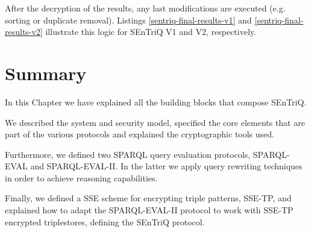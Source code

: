 After the decryption of the results, any last modifications are executed (e.g. sorting or duplicate removal). Listings \ref{sentriq-final-results-v1} and \ref{sentriq-final-results-v2} illustrate this logic for \gls{SEnTriQ} V1 and V2, respectively.

%

%

\section{Summary}

In this Chapter we have explained all the building blocks that compose \gls{SEnTriQ}. 

We described the system and security model, specified the core elements that are part of the various protocols and explained the cryptographic tools used. 

Furthermore, we defined two \gls{SPARQL} query evaluation protocols, SPARQL-EVAL and SPARQL-EVAL-II. In the latter we apply query rewriting techniques in order to achieve reasoning capabilities. 

Finally, we defined a \gls{SSE} scheme for encrypting triple patterns, SSE-TP, and explained how to adapt the SPARQL-EVAL-II protocol to work with SSE-TP encrypted triplestores, defining the \gls{SEnTriQ} protocol.


